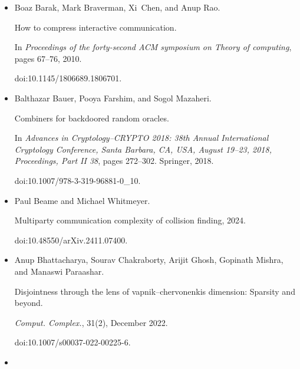 \documentclass[10pt,a4paper]{article}
\begin{document}
\begin{itemize}
\emph{Journal of Computer and System Sciences}, 68(4):702–732, 2004.


doi:10.1016/J.JCSS.2003.11.006.





\item[] 
[6]

Boaz Barak, Mark Braverman, Xi Chen, and Anup Rao.


How to compress interactive communication.


In \emph{Proceedings of the forty-second ACM symposium on Theory of
computing}, pages 67–76, 2010.


doi:10.1145/1806689.1806701.





\item[] 
[7]

Balthazar Bauer, Pooya Farshim, and Sogol Mazaheri.


Combiners for backdoored random oracles.


In \emph{Advances in Cryptology–CRYPTO 2018: 38th Annual
International Cryptology Conference, Santa Barbara, CA, USA, August 19–23,
2018, Proceedings, Part II 38}, pages 272–302. Springer, 2018.


doi:10.1007/978-3-319-96881-0\_10.





\item[] 
[8]

Paul Beame and Michael Whitmeyer.


Multiparty communication complexity of collision finding, 2024.


doi:10.48550/arXiv.2411.07400.





\item[] 
[9]

Anup Bhattacharya, Sourav Chakraborty, Arijit Ghosh, Gopinath Mishra, and
Manaswi Paraashar.


Disjointness through the lens of vapnik–chervonenkis dimension:
Sparsity and beyond.


\emph{Comput. Complex.}, 31(2), December 2022.


doi:10.1007/s00037-022-00225-6.





\item[] 
[10]


\end{itemize}
\end{document}
